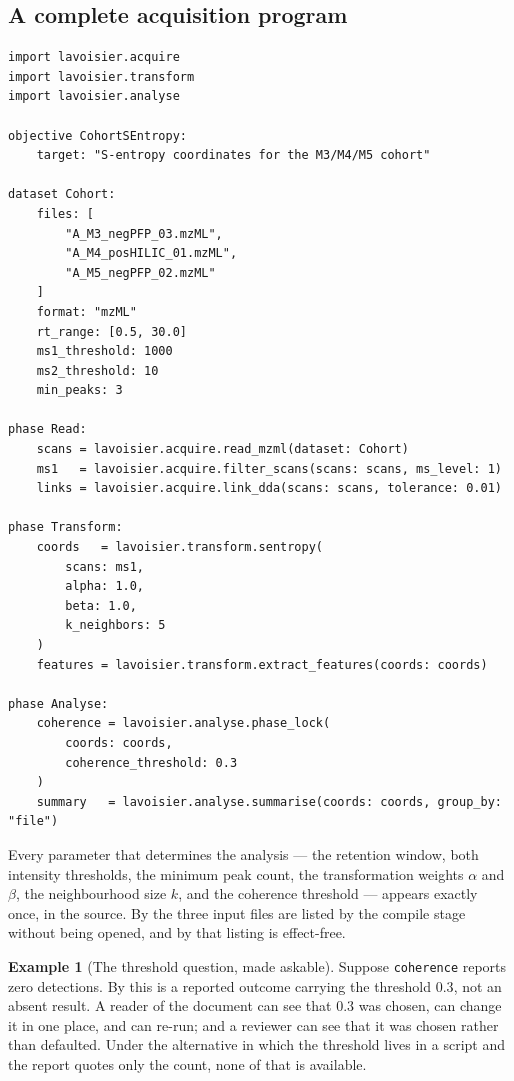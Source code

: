 \documentclass[11pt,twocolumn,a4paper]{article}
\theoremstyle{ssthm}
\theoremstyle{definition}
\newtheorem{example}[theorem]{Example}
\theoremstyle{remark}
\newcommand{\shk}[1]{\texttt{#1}}
\begin{document}
\subsection{A complete acquisition program}

\begin{lstlisting}[caption={Reading a cohort, transforming, and analysing.}]
import lavoisier.acquire
import lavoisier.transform
import lavoisier.analyse

objective CohortSEntropy:
    target: "S-entropy coordinates for the M3/M4/M5 cohort"

dataset Cohort:
    files: [
        "A_M3_negPFP_03.mzML",
        "A_M4_posHILIC_01.mzML",
        "A_M5_negPFP_02.mzML"
    ]
    format: "mzML"
    rt_range: [0.5, 30.0]
    ms1_threshold: 1000
    ms2_threshold: 10
    min_peaks: 3

phase Read:
    scans = lavoisier.acquire.read_mzml(dataset: Cohort)
    ms1   = lavoisier.acquire.filter_scans(scans: scans, ms_level: 1)
    links = lavoisier.acquire.link_dda(scans: scans, tolerance: 0.01)

phase Transform:
    coords   = lavoisier.transform.sentropy(
        scans: ms1,
        alpha: 1.0,
        beta: 1.0,
        k_neighbors: 5
    )
    features = lavoisier.transform.extract_features(coords: coords)

phase Analyse:
    coherence = lavoisier.analyse.phase_lock(
        coords: coords,
        coherence_threshold: 0.3
    )
    summary   = lavoisier.analyse.summarise(coords: coords, group_by: "file")
\end{lstlisting}

Every parameter that determines the analysis --- the retention window,
both intensity thresholds, the minimum peak count, the transformation
weights $\alpha$ and $\beta$, the neighbourhood size $k$, and the
coherence threshold --- appears exactly once, in the source. By
 the three input files are listed by the
compile stage without being opened, and by  that listing
is effect-free.

\begin{example}[The threshold question, made askable]
\label{ex:threshold}
Suppose \shk{coherence} reports zero detections. By
 this is a reported outcome carrying the
threshold $0.3$, not an absent result. A reader of the document can see
that $0.3$ was chosen, can change it in one place, and can re-run; and a
reviewer can see that it was chosen rather than defaulted. Under the
alternative in which the threshold lives in a script and the report
quotes only the count, none of that is available.
\end{example}
\end{document}

